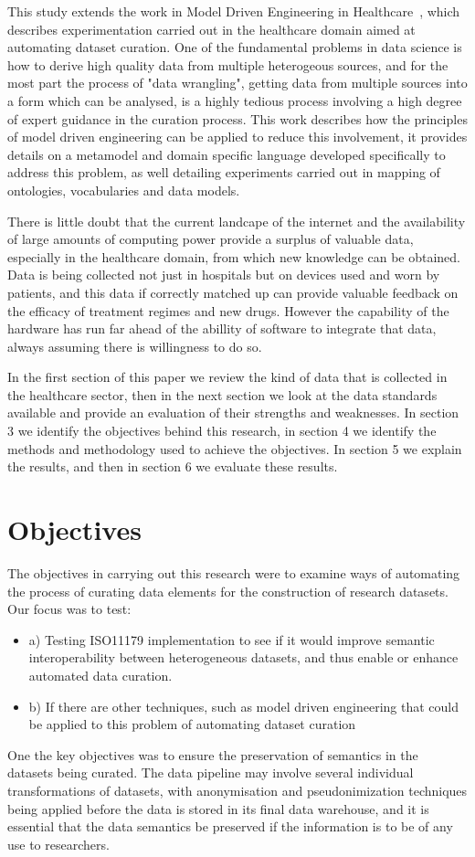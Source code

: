 \documentclass[runningheads]{llncs}
\begin{document}
	This study extends the work in Model Driven Engineering in Healthcare~\cite{modelsward19}, which describes experimentation carried out in the healthcare domain aimed at automating dataset curation. One of the fundamental problems in data science is how to derive high quality data from multiple heterogeous sources, and for the most part the process of "data wrangling", getting data from multiple sources into a form which can be analysed, is a highly tedious process involving a high degree of expert guidance in the curation process. This work describes how the principles of model driven engineering can be applied to reduce this involvement, it provides details on a metamodel and domain specific language developed specifically to address this problem, as well detailing experiments carried out in mapping of ontologies, vocabularies and data models.
	
	 There is little doubt that the current landcape of the internet and the availability of large amounts of computing power provide a surplus of valuable data, especially in the healthcare domain, from which new knowledge can be obtained. Data is being collected not just in hospitals but on devices used and worn by patients, and this data if correctly matched up can provide valuable feedback on the efficacy of treatment regimes and new drugs. However the capability of the hardware has run far ahead of the abillity of software to integrate that data, always assuming there is willingness to do so. 
	 
	 In the first section of this paper we review the kind of data that is collected in the healthcare sector, then in the next section we look at the data standards available and provide an evaluation of their strengths and weaknesses. In section 3 we identify the objectives behind this research, in section 4 we identify the methods and methodology used to achieve the objectives. In section 5 we explain the results, and then in section 6 we evaluate these results.
	 
	 \section{Objectives} 
	 The objectives in carrying out this research were to examine ways of automating the process of curating data elements for the construction of research datasets. Our focus was to test:
	 \begin{itemize}
	 	\item a) Testing ISO11179 implementation to see if it would improve semantic interoperability between heterogeneous datasets, and thus enable or enhance automated data curation.
	 	\item b) If there are other techniques, such as model driven engineering that could be applied to this problem of automating dataset curation
	 \end{itemize} 
 One the key objectives was to ensure the preservation of semantics in the datasets being curated. The data pipeline may involve several individual transformations of datasets, with anonymisation and pseudonimization techniques being applied before the data is stored in its final data warehouse, and it is essential that the data semantics be preserved if the information is to be of any use to researchers. 
	
\end{document}
